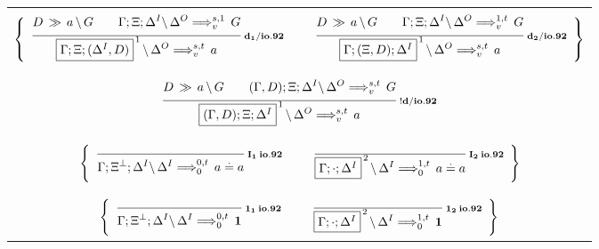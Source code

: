\clearpage
\begin{figure}[t]
  \begin{center}
    \leavevmode

    \begin{tabular}{|c|}
      \hline \\
      $\left\{
        \begin{array}{ccc}
          \ruleII
            {\decd{D}{a}{G}}
            {\ioIXc{\G;\X;\D^I}{\D^O}{G}{v}{s,1}}
            {\ioIXc{\fb{\G;\X;(\D^I,D)}{1}}{\D^O}{a}{v}{s,t}}
            {d_1/io.92}
        &
          \hspace{0.5em}
        &
          \ruleII
            {\decd{D}{a}{G}}
            {\ioIXc{\G;\X;\D^I}{\D^O}{G}{v}{1,t}}
            {\ioIXc{\fb{\G;(\X,D);\D^I}{1}}{\D^O}{a}{v}{s,t}}
            {d_2/io.92}
        \end{array}
      \right\}$

      \\ \\ \\
      $\ruleII
        {\decd{D}{a}{G}}
        {\ioIXc{(\G,D);\X;\D^I}{\D^O}{G}{v}{s,t}}
        {\ioIXc{\fb{(\G,D);\X;\D^I}{1}}{\D^O}{a}{v}{s,t}}
        {!d/io.92}$

      \\ \\ \\
      $\left\{
        \begin{array}{ccc}
          \ruleI
            {}
            {\ioIXc{\G;\X^\Bot;\D^I}{\D^I}{\eq{a}{a}}{0}{0,t}}
            {I_1 \: io.92}
        &
          \hspace{0.5em}
        &
          \ruleI
            {}
            {\ioIXc{\fb{\G;\cdot;\D^I}{2}}{\D^I}{\eq{a}{a}}{0}{1,t}}
            {I_2 \: io.92}
        \end{array}
      \right\}$

      \\ \\ \\
      $\left\{
        \begin{array}{ccc}
          \ruleI
            {}
            {\ioIXc{\G;\X^\Bot;\D^I}{\D^I}{\One}{0}{0,t}}
            {\One_1 \: io.92}
        &
          \hspace{0.5em}
        &
          \ruleI
            {}
            {\ioIXc{\fb{\G;\cdot;\D^I}{2}}{\D^I}{\One}{0}{1,t}}
            {\One_2 \: io.92}
        \end{array}
      \right\}$


\end{tabular}
\end{center}
\end{figure}
